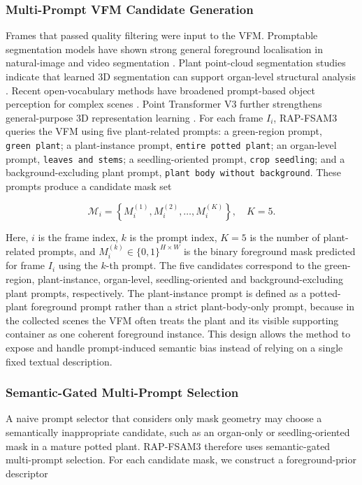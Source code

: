 \documentclass[a4paper]{cas-sc}
\begin{document}
\subsubsection{Multi-Prompt VFM Candidate Generation}\label{sec:multi-prompt-vfm-candidates}

Frames that passed quality filtering were input to the VFM. Promptable segmentation models have shown strong general foreground localisation in natural-image and video segmentation \cite{ref38,ref39,ref71}. Plant point-cloud segmentation studies indicate that learned 3D segmentation can support organ-level structural analysis \cite{ref42,ref43}. Recent open-vocabulary methods have broadened prompt-based object perception for complex scenes \cite{ref40,ref64}. Point Transformer V3 further strengthens general-purpose 3D representation learning \cite{ref44}. For each frame \(I_i\), RAP-FSAM3 queries the VFM using five plant-related prompts: a green-region prompt, \texttt{green\ plant}; a plant-instance prompt, \texttt{entire\ potted\ plant}; an organ-level prompt, \texttt{leaves\ and\ stems}; a seedling-oriented prompt, \texttt{crop\ seedling}; and a background-excluding plant prompt, \texttt{plant\ body\ without\ background}. These prompts produce a candidate mask set

\[
\mathcal{M}_i=\left\{M_i^{(1)},M_i^{(2)},\ldots,M_i^{(K)}\right\}, \quad K=5.
\]

Here, \(i\) is the frame index, \(k\) is the prompt index, \(K=5\) is the number of plant-related prompts, and \(M_i^{(k)}\in\{0,1\}^{H\times W}\) is the binary foreground mask predicted for frame \(I_i\) using the \(k\)-th prompt. The five candidates correspond to the green-region, plant-instance, organ-level, seedling-oriented and background-excluding plant prompts, respectively. The plant-instance prompt is defined as a potted-plant foreground prompt rather than a strict plant-body-only prompt, because in the collected scenes the VFM often treats the plant and its visible supporting container as one coherent foreground instance. This design allows the method to expose and handle prompt-induced semantic bias instead of relying on a single fixed textual description.

\subsubsection{Semantic-Gated Multi-Prompt Selection}\label{sec:semantic-gated-selection}

A naive prompt selector that considers only mask geometry may choose a semantically inappropriate candidate, such as an organ-only or seedling-oriented mask in a mature potted plant. RAP-FSAM3 therefore uses semantic-gated multi-prompt selection. For each candidate mask, we construct a foreground-prior descriptor
\end{document}
